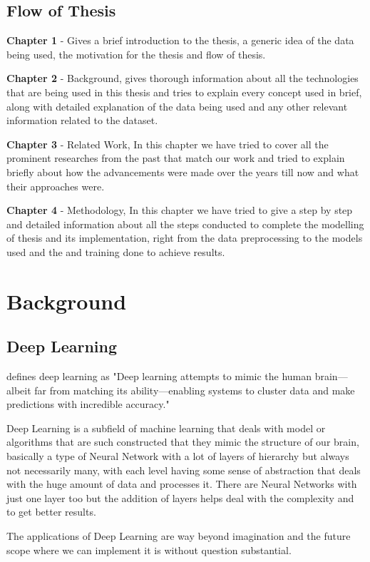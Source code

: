 \documentclass[oneside,12pt]{Classes/RoboticsLaTeX}
\begin{document}
\section{Flow of Thesis}
\textbf{Chapter 1} - Gives a brief introduction to the thesis, a generic idea of the data being used, the motivation for the thesis and flow of thesis.

\noindent
\textbf{Chapter 2} - Background, gives thorough information about all the technologies that are being used in this thesis and tries to explain every concept used in brief, along with detailed explanation of the data being used and any other relevant  information related to the dataset.

\noindent
\textbf{Chapter 3} - Related Work, In this chapter we have tried to cover all the prominent researches from the past that match our work and tried to explain briefly about how the advancements were made over the years till now and what their approaches were.

\noindent
\textbf{Chapter 4} - Methodology, In this chapter we have tried to give a step by step and detailed information about all the steps conducted to complete the modelling of thesis and its implementation, right from the data preprocessing to the models used and the and training done to achieve results.

\chapter{Background}
\label{chap:backg}

\section{Deep Learning}
\cite{ibm} defines deep learning as "Deep learning attempts to mimic the human brain—albeit far from matching its ability—enabling systems to cluster data and make predictions with incredible accuracy."

Deep Learning is a subfield of machine learning that deals with model or algorithms that are such constructed that they mimic the structure of our brain, basically a type of Neural Network with a lot of layers of hierarchy but always not necessarily many, with each level having some sense of abstraction that deals with the huge amount of data and processes it. There are Neural Networks with just one layer too but the addition of layers helps deal with the complexity and to get better results.

The applications of Deep Learning are way beyond imagination and the future scope where we can implement it is without question substantial.
\end{document}
